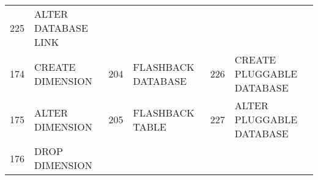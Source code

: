 \begin{longtable}[]{@{}llllll@{}}
\begin{minipage}[t]{0.06\columnwidth}
225\strut
\end{minipage} & \begin{minipage}[t]{0.24\columnwidth}\raggedright\strut
ALTER DATABASE LINK\strut
\end{minipage}\tabularnewline
\begin{minipage}[t]{0.06\columnwidth}\raggedright\strut
174\strut
\end{minipage} & \begin{minipage}[t]{0.19\columnwidth}\raggedright\strut
CREATE DIMENSION\strut
\end{minipage} & \begin{minipage}[t]{0.06\columnwidth}\raggedright\strut
204\strut
\end{minipage} & \begin{minipage}[t]{0.24\columnwidth}\raggedright\strut
FLASHBACK DATABASE\strut
\end{minipage} & \begin{minipage}[t]{0.06\columnwidth}\raggedright\strut
226\strut
\end{minipage} & \begin{minipage}[t]{0.24\columnwidth}\raggedright\strut
CREATE PLUGGABLE DATABASE\strut
\end{minipage}\tabularnewline
\begin{minipage}[t]{0.06\columnwidth}\raggedright\strut
175\strut
\end{minipage} & \begin{minipage}[t]{0.19\columnwidth}\raggedright\strut
ALTER DIMENSION\strut
\end{minipage} & \begin{minipage}[t]{0.06\columnwidth}\raggedright\strut
205\strut
\end{minipage} & \begin{minipage}[t]{0.24\columnwidth}\raggedright\strut
FLASHBACK TABLE\strut
\end{minipage} & \begin{minipage}[t]{0.06\columnwidth}\raggedright\strut
227\strut
\end{minipage} & \begin{minipage}[t]{0.24\columnwidth}\raggedright\strut
ALTER PLUGGABLE DATABASE\strut
\end{minipage}\tabularnewline
\begin{minipage}[t]{0.06\columnwidth}\raggedright\strut
176\strut
\end{minipage} & \begin{minipage}[t]{0.19\columnwidth}\raggedright\strut
DROP DIMENSION\strut

\end{minipage}
\end{longtable}
